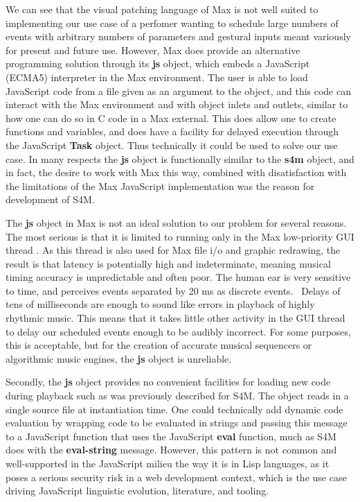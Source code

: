 \documentclass[acmsmall]{acmart}
\begin{document}
We can see that the visual patching language of Max is not well suited to implementing
our use case of a perfomer wanting to schedule large numbers of events with arbitrary numbers of
parameters and gestural inputs meant variously for present and future use. 
However, Max does provide an alternative programming solution through its
\textbf{js} object, which embeds a JavaScript (ECMA5) interpreter in the Max environment.
The user is able to load JavaScript code from a file given as an argument to the object,
and this code can interact with the Max environment and with object inlets and outlets,
similar to how one can do so in C code in a Max external.
This does allow one to create functions and variables, and does have a facility
for delayed execution through the JavaScript \textbf{Task} object. 
Thus technically it could be used to solve our use case.
In many respects the \textbf{js} object is functionally similar to the \textbf{s4m} object,
and in fact, the desire to work with Max this way, combined with disatisfaction with the
limitations of the Max JavaScript implementation was the reason for development of S4M.

The \textbf{js} object in Max is not an ideal solution to our problem for several reasons. 
The most serious is that it is limited to running only in the Max low-priority GUI thread \cite{Cycling74}.
 As this
thread is also used for Max file i/o and graphic redrawing, the result is that latency
is potentially high and indeterminate, meaning musical timing accuracy is unpredictable and often poor.
The human ear is very sensitive to time, and perceives events separated by 20 ms as discrete
events. \
Delays of tens of milliseconds are enough to sound like errors in playback
of highly rhythmic music. This means that it takes little other activity in the
GUI thread to delay our scheduled events enough to be audibly incorrect. 
For some purposes, this is acceptable, but for the creation of accurate 
musical sequencers or algorithmic music engines, the \textbf{js} object is unreliable. 

Secondly, the \textbf{js} object provides no convenient facilities for loading new code
during playback such as was previously described for S4M.
The object reads in a single source file at instantiation time.
One could technically add dynamic code evaluation by wrapping
code to be evaluated in strings and passing this message to a JavaScript function
that uses the JavaScript \textbf{eval} function, much as S4M does with the
\textbf{eval-string} message. However, this pattern is not common and well-supported
in the JavaScript milieu the way it is in Lisp languages, as it poses a serious security risk in a 
web development context, which is the use case driving JavaScript linguistic
evolution, literature, and tooling.
\end{document}
